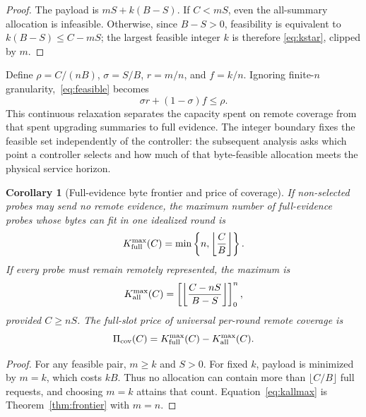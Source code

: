 \documentclass[10pt,journal]{IEEEtran}
\newtheorem{corollary}{Corollary}
\begin{document}
\begin{proof}
The payload is $mS+k(B-S)$. If $C<mS$, even the all-summary allocation is
infeasible. Otherwise, since $B-S>0$, feasibility is equivalent to
$k(B-S)\leq C-mS$; the largest feasible integer $k$ is therefore
\eqref{eq:kstar}, clipped by $m$.
\end{proof}

Define $\rho=C/(nB)$, $\sigma=S/B$, $r=m/n$, and $f=k/n$. Ignoring
finite-$n$ granularity,~\eqref{eq:feasible} becomes
\begin{equation}
\boxed{\sigma r+(1-\sigma)f\leq\rho}.
\label{eq:frontier}
\end{equation}
This continuous relaxation separates the capacity spent on remote coverage
from that spent upgrading summaries to full evidence. The integer boundary
fixes the feasible set independently of the controller: the subsequent
analysis asks which point a controller selects and how much of that
byte-feasible allocation meets the physical service horizon.

\begin{corollary}[Full-evidence byte frontier and price of coverage]
\label{cor:fullfrontier}
If non-selected probes may send no remote evidence, the maximum number of
full-evidence probes whose bytes can fit in one idealized round is
\begin{equation}
K_{\rm full}^{\max}(C)
=\min\left\{n,\left\lfloor\frac{C}{B}\right\rfloor\right\}.
\label{eq:kfullmax}
\end{equation}
If every probe must remain remotely represented, the maximum is
\begin{equation}
K_{\rm all}^{\max}(C)
=\left[\left\lfloor\frac{C-nS}{B-S}\right\rfloor\right]_0^n,
\label{eq:kallmax}
\end{equation}
provided $C\geq nS$. The full-slot price of universal per-round remote
coverage is
\begin{equation}
\Pi_{\rm cov}(C)=K_{\rm full}^{\max}(C)-K_{\rm all}^{\max}(C).
\label{eq:coverageprice}
\end{equation}
\end{corollary}

\begin{proof}
For any feasible pair, $m\geq k$ and $S>0$. For fixed $k$, payload is
minimized by $m=k$, which costs $kB$. Thus no allocation can contain more than
$\lfloor C/B\rfloor$ full requests, and choosing $m=k$ attains that count.
Equation~\eqref{eq:kallmax} is Theorem~\ref{thm:frontier} with $m=n$.
\end{proof}
\end{document}

